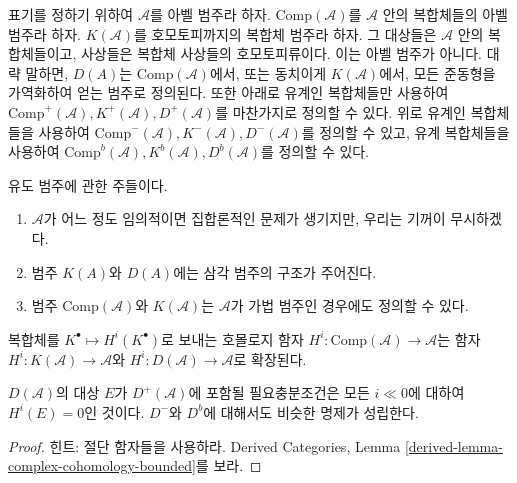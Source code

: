 \noindent
표기를 정하기 위하여 $\mathcal{A}$를 아벨 범주라 하자.
$\text{Comp}(\mathcal{A})$를 $\mathcal{A}$ 안의 복합체들의 아벨 범주라
하자. $K(\mathcal{A})$를 호모토피까지의 복합체 범주라 하자. 그 대상들은
$\mathcal{A}$ 안의 복합체들이고, 사상들은 복합체 사상들의 호모토피류이다.
이는 아벨 범주가 아니다. 대략 말하면, $D(A)$는
$\text{Comp}(\mathcal{A})$에서, 또는 동치이게 $K(\mathcal{A})$에서,
모든 준동형을 가역화하여 얻는 범주로 정의된다.
또한 아래로 유계인 복합체들만 사용하여
$\text{Comp}^+(\mathcal{A}), K^+(\mathcal{A}), D^+(\mathcal{A})$를
마찬가지로 정의할 수 있다. 위로 유계인 복합체들을 사용하여
$\text{Comp}^-(\mathcal{A}), K^-(\mathcal{A}), D^-(\mathcal{A})$를
정의할 수 있고, 유계 복합체들을 사용하여
$\text{Comp}^b(\mathcal{A}), K^b(\mathcal{A}), D^b(\mathcal{A})$를
정의할 수 있다.

\begin{remark}
\label{remarks-derived-categories}
유도 범주에 관한 주들이다.
\begin{enumerate}
\item
$\mathcal{A}$가 어느 정도 임의적이면 집합론적인 문제가 생기지만,
우리는 기꺼이 무시하겠다.
\item
범주 $K(A)$와 $D(A)$에는 삼각 범주의 구조가 주어진다.
\item
범주 $\text{Comp}(\mathcal{A})$와 $K(\mathcal{A})$는
$\mathcal{A}$가 가법 범주인 경우에도 정의할 수 있다.
\end{enumerate}
\end{remark}

\noindent
복합체를 $K^\bullet \mapsto H^i(K^\bullet)$로 보내는 호몰로지 함자
$H^i : \text{Comp}(\mathcal{A}) \to \mathcal{A}$는 함자
$H^i : K(\mathcal{A}) \to \mathcal{A}$와
$H^i : D(\mathcal{A}) \to \mathcal{A}$로 확장된다.

\begin{lemma}
\label{lemma-when-in-bounded}
$D(\mathcal{A})$의 대상 $E$가 $D^+(\mathcal{A})$에 포함될 필요충분조건은
모든 $i \ll 0$에 대하여 $H^i(E) =0 $인 것이다. $D^-$와 $D^b$에
대해서도 비슷한 명제가 성립한다.
\end{lemma}

\begin{proof}
힌트: 절단 함자들을 사용하라. Derived Categories, Lemma
\ref{derived-lemma-complex-cohomology-bounded}를 보라.
\end{proof}

